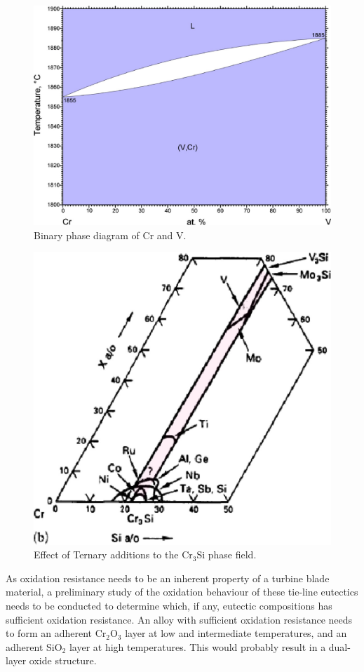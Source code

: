 \begin{figure}[H]
\begin{center}
\includegraphics{CrV}
\caption{Binary phase diagram of Cr and V.}\label{fig:CrV}
\end{center}
\end{figure}
%
\begin{figure}[H]
\begin{center}
\includegraphics{Cr3Si_alloying}
\caption{Effect of Ternary additions to the Cr$_3$Si phase field.}\label{fig:Cr$_3$Si_alloying}
\end{center}
\end{figure}
%
As oxidation resistance needs to be an inherent property of a turbine blade material, a preliminary study of the oxidation behaviour of these tie-line eutectics needs to be conducted to determine which, if any, eutectic compositions has sufficient oxidation resistance. An alloy with sufficient oxidation resistance needs to form an adherent Cr$_2$O$_3$ layer at low and intermediate temperatures, and an adherent SiO$_2$ layer at high temperatures. This would probably result in a dual-layer oxide structure. 

